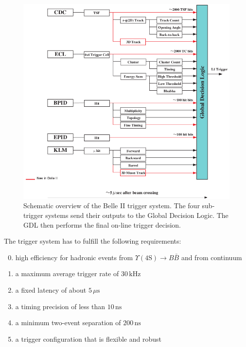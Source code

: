\documentclass[a4paper,11pt,twosided,final,german,openbib,pdftex,listof=totoc,bibliography=totoc]{scrbook}
\begin{document}
\begin{figure}[h!]
	\centering
	\includegraphics[width=\textwidth]{Bilder/Trigger}
	\caption[Schematic Overview Of The Trigger System]{Schematic overview of the Belle II trigger system. The four sub-trigger systems send their outputs to the Global Decision Logic. The GDL then performs the final on-line trigger decision. \cite{LumiTrigger}}
	\label{fig:Trigger}
\end{figure}




The trigger system has to fulfill the following requirements:\cite{B2TR}

\begin{enumerate}
	\setcounter{enumi}{-1}
	\item high efficiency for hadronic events from $\Upsilon(4\textrm{S}) \rightarrow B\bar{B}$ and from continuum
	\item a maximum average trigger rate of $30\,\textrm{kHz}$
	\item a fixed latency of about $5\,\mu \textrm{s}$
	\item a timing precision of less than $10\,\textrm{ns}$
	\item a minimum two-event separation of $200\,\textrm{ns}$
	\item a trigger configuration that is flexible and robust
\end{enumerate}
\end{document}
